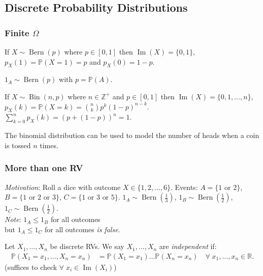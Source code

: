 \subsection{Discrete Probability Distributions}

\subsubsection{Finite $\Omega$}

\begin{definition}
    If $X \sim \operatorname{Bern}(p)$ where $p \in [0, 1]$ then $\operatorname{Im}(X) = \{0, 1\}$, $p_X(1) = \mathbb{P}(X = 1) = p$ and $p_X(0) = 1 - p$.
\end{definition} 

\begin{example}
    $1_A \sim \operatorname{Bern}(p)$ with $p = \mathbb{P}(A)$.
\end{example} 

\begin{definition}
    If $X \sim \operatorname{Bin}(n, p)$ where $n \in \mathbb{Z}^+$ and $p \in [0, 1]$ then $\operatorname{Im}(X) = \{0, 1, \dots, n\}$, $p_X(k) = \mathbb{P}(X = k) = \binom{n}{k} p^k (1- p)^{n -k}$.
    $\sum_{k=0}^{n} p_X(k) = (p + (1-p))^n = 1$.
\end{definition} 

The binomial distribution can be used to model the number of heads when a coin is tossed $n$ times.

\subsubsection{More than one RV}

\emph{Motivation}: Roll a dice with outcome $X \in \{1, 2, \dots, 6\}$.
Events: $A = \{1 \text{ or } 2\}$, $B = \{1 \text{ or } 2 \text{ or } 3\}$, $C = \{1 \text{ or } 3 \text{ or } 5\}$.
$1_A \sim \operatorname{Bern}\left(\frac{1}{3}\right)$, $1_B \sim \operatorname{Bern}\left(\frac{1}{2}\right)$, $1_C \sim \operatorname{Bern}\left(\frac{1}{2}\right)$.\\
\emph{Note}: $1_A \leq 1_B$ for all outcomes \\
but $1_A \leq 1_C$ for all outcomes \emph{is false}.

\begin{definition}
    Let $X_1, \dots, X_n$ be discrete RVs.
    We say $X_1, \dots, X_n$ are \emph{independent} if:
    \begin{align*}
        \mathbb{P}(X_1 = x_1, \dots, X_n = x_n) &= \mathbb{P}(X_1 = x_1) \dots \mathbb{P}(X_n = x_n) \quad \forall \; x_1, \dots, x_n \in \mathbb{R}.
    \end{align*} 
    \color{blue} (suffices to check $\forall \; x_i \in \operatorname{Im}(X_i)$)
\end{definition} 

